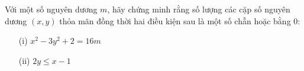\ifshowproblem
\begin{problem}\label{example:KOR-2015-MO-P1}
    Với một số nguyên dương \( m \), hãy chứng minh rằng số lượng các cặp số nguyên dương \( (x, y) \)
    thỏa mãn đồng thời hai điều kiện sau là một số chẵn hoặc bằng \( 0 \):
    \begin{itemize}[topsep=0pt, partopsep=0pt, itemsep=0pt]
        \item[(i)] \( x^2 - 3y^2 + 2 = 16m \)
        \item[(ii)] \( 2y \le x - 1 \)
    \end{itemize}
\end{problem}
\fi

\footnotemark
{}
\fi